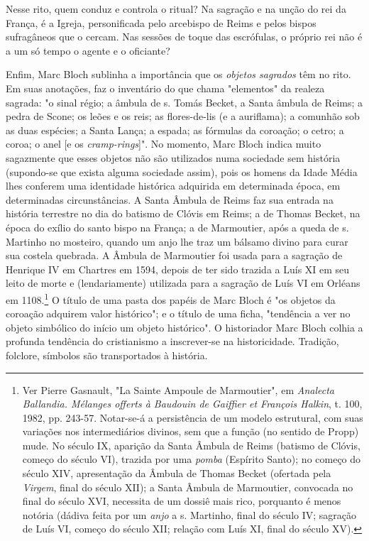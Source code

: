 \documentclass[a5paper]{book}
\begin{document}
Nesse rito, quem conduz e controla o ritual? Na sagração e na unção do rei da França, é a Igreja, personificada pelo arcebispo de Reims e pelos bispos sufragâneos que o cercam. Nas sessões de toque das escrófulas, o próprio rei não é a um só tempo o agente e o oficiante?

Enfim, Marc Bloch sublinha a importância que os \textit{objetos sagrados} têm no rito. Em suas anotações, faz o inventário do que chama "elementos" da realeza sagrada: "o sinal régio; a âmbula de s. Tomás Becket, a Santa âmbula de Reims; a pedra de Scone; os leões e os reis; as flores-de-lis (e a auriflama); a comunhão sob as duas espécies; a Santa Lança; a espada; as fórmulas da coroação; o cetro; a coroa; o anel [e os \textit{cramp-rings}]". No momento, Marc Bloch indica muito sagazmente que esses objetos não são utilizados numa sociedade sem história (supondo-se que exista alguma sociedade assim), pois os homens da Idade Média lhes conferem uma identidade histórica adquirida em determinada época, em determinadas circunstâncias. A Santa Âmbula de Reims faz sua entrada na história terrestre no dia do batismo de Clóvis em Reims; a de Thomas Becket, na época do exílio do santo bispo na França; a de Marmoutier, após a queda de s. Martinho no mosteiro, quando um anjo lhe traz um bálsamo divino para curar sua costela quebrada. A Âmbula de Marmoutier foi usada para a sagração de Henrique IV em Chartres em 1594, depois de ter sido trazida a Luís XI em seu leito de morte e (lendariamente) utilizada para a sagração de Luís VI em Orléans em 1108.\footnote{Ver Pierre Gasnault, "La Sainte Ampoule de Marmoutier", em \textit{Analecta Ballandia. Mélanges offerts à Baudouin de Gaiffier et François Halkin}, t. 100, 1982, pp. 243-57. Notar-se-á a persistência de um modelo estrutural, com suas variações nos intermediários divinos, sem que a função (no sentido de Propp) mude. No século IX, aparição da Santa Âmbula de Reims (batismo de Clóvis, começo do século VI), trazida por uma \textit{pomba} (Espírito Santo); no começo do século XIV, apresentação da Âmbula de Thomas Becket (ofertada pela \textit{Virgem}, final do século XII); a Santa Âmbula de Marmoutier, convocada no final do século XVI, necessita de um dossiê mais rico, porquanto é menos notória (dádiva feita por um \textit{anjo} a s. Martinho, final do século IV; sagração de Luís VI, começo do século XII; relação com Luís XI, final do século XV).} O título de uma pasta dos papéis de Marc Bloch é "os objetos da coroação adquirem valor histórico"; e o título de uma ficha, "tendência a ver no objeto simbólico do início um objeto histórico". O historiador Marc Bloch colhia a profunda tendência do cristianismo a inscrever-se na historicidade. Tradição, folclore, símbolos são transportados à história.
\end{document}

